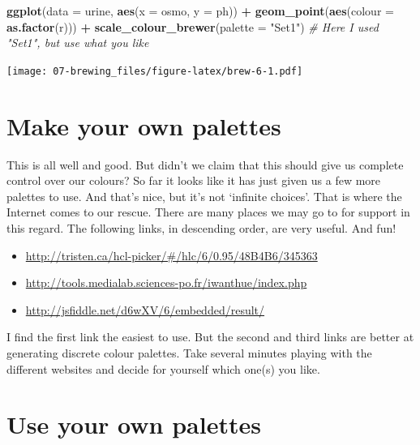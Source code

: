 \documentclass[
]{book}
\newenvironment{Shaded}{\begin{snugshade}}{\end{snugshade}}
\newcommand{\CommentTok}[1]{\textcolor[rgb]{0.56,0.35,0.01}{\textit{#1}}}
\newcommand{\DataTypeTok}[1]{\textcolor[rgb]{0.13,0.29,0.53}{#1}}
\newcommand{\KeywordTok}[1]{\textcolor[rgb]{0.13,0.29,0.53}{\textbf{#1}}}
\newcommand{\NormalTok}[1]{#1}
\newcommand{\OperatorTok}[1]{\textcolor[rgb]{0.81,0.36,0.00}{\textbf{#1}}}
\newcommand{\StringTok}[1]{\textcolor[rgb]{0.31,0.60,0.02}{#1}}
\providecommand{\tightlist}{%
  \setlength{\itemsep}{0pt}\setlength{\parskip}{0pt}}
\begin{document}
\begin{Shaded}
\begin{Highlighting}[]
\KeywordTok{ggplot}\NormalTok{(}\DataTypeTok{data =}\NormalTok{ urine, }\KeywordTok{aes}\NormalTok{(}\DataTypeTok{x =}\NormalTok{ osmo, }\DataTypeTok{y =}\NormalTok{ ph)) }\OperatorTok{+}
\StringTok{  }\KeywordTok{geom\_point}\NormalTok{(}\KeywordTok{aes}\NormalTok{(}\DataTypeTok{colour =} \KeywordTok{as.factor}\NormalTok{(r))) }\OperatorTok{+}
\StringTok{  }\KeywordTok{scale\_colour\_brewer}\NormalTok{(}\DataTypeTok{palette =} \StringTok{"Set1"}\NormalTok{) }\CommentTok{\# Here I used "Set1", but use what you like}
\end{Highlighting}
\end{Shaded}

\texttt{[image: 07-brewing\_files/figure-latex/brew-6-1.pdf]}

\hypertarget{make-your-own-palettes}{%
\section{Make your own palettes}\label{make-your-own-palettes}}

This is all well and good. But didn't we claim that this should give us complete control over our colours? So far it looks like it has just given us a few more palettes to use. And that's nice, but it's not `infinite choices'. That is where the Internet comes to our rescue. There are many places we may go to for support in this regard. The following links, in descending order, are very useful. And fun!

\begin{itemize}
\tightlist
\item
  \url{http://tristen.ca/hcl-picker/\#/hlc/6/0.95/48B4B6/345363}
\item
  \url{http://tools.medialab.sciences-po.fr/iwanthue/index.php}
\item
  \url{http://jsfiddle.net/d6wXV/6/embedded/result/}
\end{itemize}

I find the first link the easiest to use. But the second and third links are better at generating discrete colour palettes. Take several minutes playing with the different websites and decide for yourself which one(s) you like.

\hypertarget{use-your-own-palettes}{%
\section{Use your own palettes}\label{use-your-own-palettes}}
\end{document}
